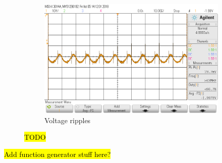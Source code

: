 \begin{figure}[H]
\begin{framed}
\begin{subfigure}[b]{0.45\textwidth}
    \end{subfigure}
    \hfill
    \begin{subfigure}[b]{0.45\textwidth}
    \centering
    \includegraphics[width = \textwidth]{figures/result/ripple.png}
    \caption{Voltage ripples}
    \end{subfigure}
    \end{framed}
    \caption{\hl{TODO}}
    \label{fig:performance}
\end{figure}


\hl{Add function generator stuff here?}

